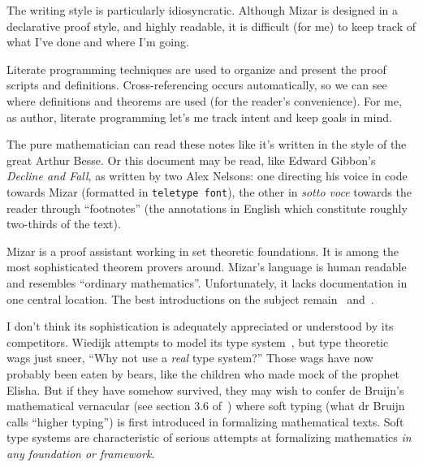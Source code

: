 
The writing style is particularly idiosyncratic. Although Mizar is
designed in a declarative proof style, and highly readable, it is
difficult (for me) to keep track of what I've done and where I'm going.

Literate programming techniques are used to organize and present the
proof scripts and definitions. Cross-referencing occurs automatically,
so we can see where definitions and theorems are used (for the reader's
convenience). For me, as author, literate programming let's me track
intent and keep goals in mind.

The pure mathematician can read these notes like it's written in the
style of the great Arthur Besse. Or this document may be read, like
Edward Gibbon's
\emph{Decline and Fall}, as written by two Alex Nelsons: one directing
his voice in code towards Mizar (formatted in \verb#teletype font#), the
other in \emph{sotto voce} towards the reader through ``footnotes'' (the
annotations in English which constitute roughly two-thirds of the text).

Mizar is a proof assistant working in set theoretic foundations. It is
among the most sophisticated theorem provers around. Mizar's language is
human readable and resembles ``ordinary mathematics''. Unfortunately, it
lacks documentation in one central location. The best introductions on
the subject remain~\cite{grabowski2010mizar} and~\cite{wiedijk2006mizman}.

I don't think its sophistication is adequately appreciated or understood
by its competitors. Wiedijk attempts to model its type
system~\cite{wiedijk2007mizar}, but type theoretic wags just sneer,
``Why not use a \emph{real} type system?'' Those wags have now probably been eaten
by bears, like the children who made mock of the prophet Elisha. But if
they have somehow survived, they may wish to confer de Bruijn's mathematical
vernacular (see section {3.6} of~\cite{de1994mathematical}) where soft
typing (what dr Bruijn calls ``higher typing'') is first introduced in
formalizing mathematical texts. Soft type systems are characteristic of
serious attempts at formalizing mathematics \emph{in any foundation or framework.}

